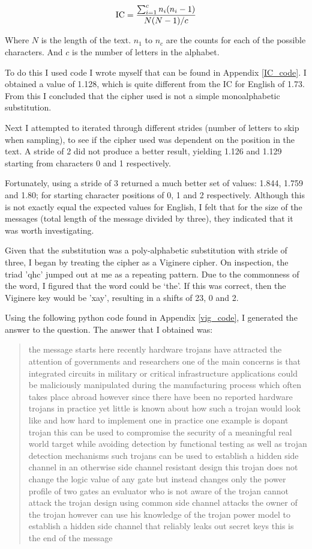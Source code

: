 \documentclass[11pt,a4paper,twoside]{article}
\begin{document}
$$
\textup{IC} =  \frac{\sum_{i=1}^{c} n_i(n_i -1)}{N(N - 1)/c}
$$

Where $N$ is the length of the text. $n_1$ to $n_c$ are the counts
for each of the possible characters. And $c$ is the number of
letters in the alphabet. 

To do this I used code I wrote myself that can be found in Appendix
\ref{IC_code}. I obtained a value of 1.128, which is quite different from the
IC for English of 1.73. From this I concluded that the cipher used is not a
simple monoalphabetic substitution. 

Next I attempted to iterated through different strides (number of letters to
skip when sampling), to see if the cipher used was dependent on the position in
the text. A stride of 2 did not produce a better result, yielding 1.126 and
1.129 starting from characters 0 and 1 respectively.  

Fortunately, using a stride of 3 returned a much better set of values: 1.844,
1.759 and 1.80; for starting character positions of 0, 1 and 2 respectively.
Although this is not exactly equal the expected values for English, I felt that
for the size of the messages (total length of the message divided by three),
they indicated that it was worth investigating.

Given that the substitution was a poly-alphabetic substitution with stride of
three, I began by treating the cipher as a Viginere cipher. On inspection, the
triad 'qhc' jumped out at me as a repeating pattern. Due to the commonness of
the word, I figured that the word could be `the'. If this was correct, then the
Viginere key would be 'xay', resulting in a shifts of 23, 0 and 2.

Using the following python code found in Appendix \ref{vig_code}, I generated
the answer to the question. The answer that I obtained was: 

\begin{quote}
\small
\raggedright
the message starts here recently hardware trojans have attracted the attention
of governments and researchers one of the main concerns is that integrated
circuits in military or critical infrastructure applications could be
maliciously manipulated during the manufacturing process which often takes
place abroad however since there have been no reported hardware trojans in
practice yet little is known about how such a trojan would look like and how
hard to implement one in practice one example is dopant trojan this can be used
to compromise the security of a meaningful real world target while avoiding
detection by functional testing as well as trojan detection mechanisms such
trojans can be used to establish a hidden side channel in an otherwise side
channel resistant design this trojan does not change the logic value of any
gate but instead changes only the power profile of two gates an evaluator who
is not aware of the trojan cannot attack the trojan design using common side
channel attacks the owner of the trojan however can use his knowledge of the
trojan power model to establish a hidden side channel that reliably leaks out
secret keys this is the end of the message
\end{quote}
 
\end{document}
